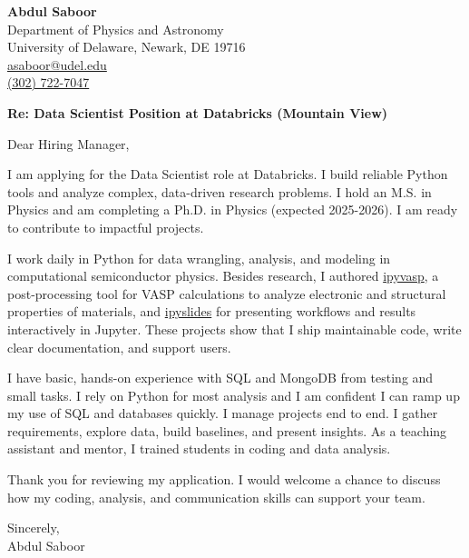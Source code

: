 \documentclass[letter,11pt]{article}
\begin{document}
\noindent
\textbf{Abdul Saboor} \\
Department of Physics and Astronomy \\
University of Delaware, Newark, DE 19716 \\
\href{mailto:asaboor@udel.edu}{asaboor@udel.edu} \\
\href{tel:+13027227047}{(302) 722-7047}

\vspace{5mm}

\noindent
\textbf{Re: Data Scientist Position at Databricks (Mountain View)}
\vspace{5mm}

\noindent
Dear Hiring Manager,

I am applying for the Data Scientist role at Databricks. I build reliable Python tools and analyze complex, data-driven research problems. I hold an M.S. in Physics and am completing a Ph.D. in Physics (expected 2025-2026). I am ready to contribute to impactful projects.

I work daily in Python for data wrangling, analysis, and modeling in computational semiconductor physics. Besides research, I authored \href{https://github.com/asaboor-gh/ipyvasp}{ipyvasp}, a post-processing tool for VASP calculations to analyze electronic and structural properties of materials, and \href{https://github.com/asaboor-gh/ipyslides}{ipyslides} for presenting workflows and results interactively in Jupyter. These projects show that I ship maintainable code, write clear documentation, and support users.

I have basic, hands-on experience with SQL and MongoDB from testing and small tasks. I rely on Python for most analysis and I am confident I can ramp up my use of SQL and databases quickly.
I manage projects end to end. I gather requirements, explore data, build baselines, and present insights. As a teaching assistant and mentor, I trained students in coding and data analysis.

Thank you for reviewing my application. I would welcome a chance to discuss how my coding, analysis, and communication skills can support your team.

\vspace{5mm}

\noindent
Sincerely, \\
Abdul Saboor
\end{document}
